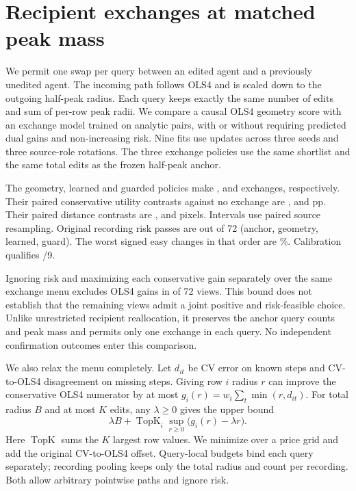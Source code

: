 \section{Recipient exchanges at matched peak mass}
We permit one swap per query between an edited agent and a
previously unedited agent. The incoming path follows OLS4 and is
scaled down to the outgoing half-peak radius. Each query keeps
exactly the same number of edits and sum of per-row peak radii.
We compare a causal OLS4 geometry score with an exchange model
trained on analytic pairs, with or without requiring predicted
dual gains and non-increasing risk. Nine fits use
\ExchangeMassUpdates{} updates across three seeds and three
source-role rotations. The three exchange policies use the same
shortlist and the same \ExchangeMassEdits{} total edits as the
frozen half-peak anchor.

The geometry, learned and guarded policies make
\ExchangeMassGeometryCount{}, \ExchangeMassLearnedCount{} and
\ExchangeMassGuardCount{} exchanges, respectively.
Their paired conservative utility contrasts against no exchange
are \ExchangeMassGeometryEffect{}, \ExchangeMassLearnedEffect{}
and \ExchangeMassGuardEffect{} pp. Their paired distance
contrasts are \ExchangeMassGeometryPair{}, \ExchangeMassLearnedPair{}
and \ExchangeMassGuardPair{} pixels. Intervals use paired source
resampling. Original recording risk passes are
\ExchangeMassPasses{} out of 72 (anchor, geometry, learned, guard).
The worst signed easy changes in that order are
\ExchangeMassWorst\%. Calibration qualifies \ExchangeMassQual{}/9.

Ignoring risk and maximizing each conservative gain separately
over the same exchange menu excludes OLS4 gains in
\ExchangeMassOLSLimit{} of 72 views. This bound does not
establish that the remaining views admit a joint positive
and risk-feasible choice. Unlike unrestricted recipient
reallocation, it preserves the anchor query counts and peak
mass and permits only one exchange in each query.
No independent confirmation outcomes enter this comparison.

We also relax the menu completely. Let $d_{it}$ be CV error on
known steps and CV-to-OLS4 disagreement on missing steps. Giving
row $i$ radius $r$ can improve the conservative OLS4 numerator
by at most $g_i(r)=w_i\sum_t\min(r,d_{it})$. For total radius $B$
and at most $K$ edits, any $\lambda\geq0$ gives the upper bound
\[
 \lambda B + \operatorname{TopK}_{i}\sup_{r\geq0}
          \bigl(g_i(r)-\lambda r\bigr).
\]
Here $\operatorname{TopK}$ sums the $K$ largest row values.
We minimize over a price grid and add the original CV-to-OLS4
offset. Query-local budgets bind each query separately; recording
pooling keeps only the total radius and count per recording.
Both allow arbitrary pointwise paths and ignore risk.

